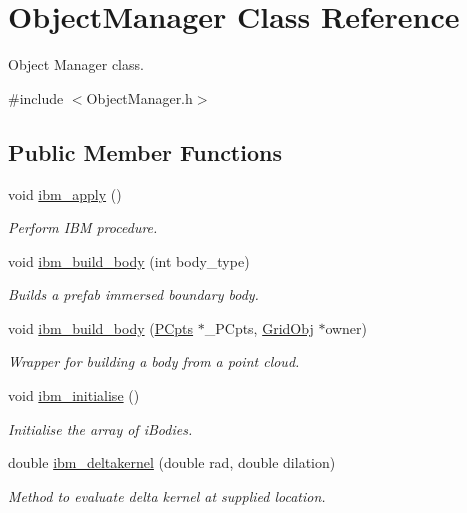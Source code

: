 \hypertarget{class_object_manager}{}\section{Object\+Manager Class Reference}
\label{class_object_manager}


Object Manager class.  




{\ttfamily \#include $<$Object\+Manager.\+h$>$}

\subsection*{Public Member Functions}
\begin{DoxyCompactItemize}
\item 
void \hyperlink{class_object_manager_a2ec2df889c396d94d2fe1807c10847bb}{ibm\+\_\+apply} ()
\begin{DoxyCompactList}\small\item\em Perform I\+BM procedure. \end{DoxyCompactList}\item 
void \hyperlink{class_object_manager_af89336910b6f3157e5b17b4ea6d30a12}{ibm\+\_\+build\+\_\+body} (int body\+\_\+type)
\begin{DoxyCompactList}\small\item\em Builds a prefab immersed boundary body. \end{DoxyCompactList}\item 
void \hyperlink{class_object_manager_ac8270fe5b646e512a34748b5ca51671c}{ibm\+\_\+build\+\_\+body} (\hyperlink{class_p_cpts}{P\+Cpts} $\ast$\+\_\+\+P\+Cpts, \hyperlink{class_grid_obj}{Grid\+Obj} $\ast$owner)
\begin{DoxyCompactList}\small\item\em Wrapper for building a body from a point cloud. \end{DoxyCompactList}\item 
void \hyperlink{class_object_manager_aa4e5e286a6fe1d9fcaf393ffed329250}{ibm\+\_\+initialise} ()
\begin{DoxyCompactList}\small\item\em Initialise the array of i\+Bodies. \end{DoxyCompactList}\item 
double \hyperlink{class_object_manager_a4e55e3a84bae37a75f8487fd575169fb}{ibm\+\_\+deltakernel} (double rad, double dilation)
\begin{DoxyCompactList}\small\item\em Method to evaluate delta kernel at supplied location. \end{DoxyCompactList}\item 

\end{DoxyCompactItemize}
